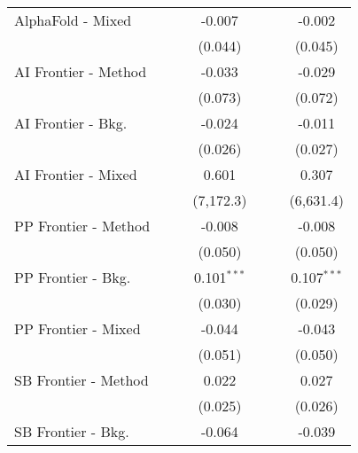 \begin{tabular}{lcccccc}
   AlphaFold - Mixed    &                &              & -0.007        &                &              & -0.002\\   
                        &                &              & (0.044)       &                &              & (0.045)\\   
   AI Frontier - Method &                &              & -0.033        &                &              & -0.029\\   
                        &                &              & (0.073)       &                &              & (0.072)\\   
   AI Frontier - Bkg.   &                &              & -0.024        &                &              & -0.011\\   
                        &                &              & (0.026)       &                &              & (0.027)\\   
   AI Frontier - Mixed  &                &              & 0.601         &                &              & 0.307\\   
                        &                &              & (7,172.3)     &                &              & (6,631.4)\\   
   PP Frontier - Method &                &              & -0.008        &                &              & -0.008\\   
                        &                &              & (0.050)       &                &              & (0.050)\\   
   PP Frontier - Bkg.   &                &              & 0.101$^{***}$ &                &              & 0.107$^{***}$\\   
                        &                &              & (0.030)       &                &              & (0.029)\\   
   PP Frontier - Mixed  &                &              & -0.044        &                &              & -0.043\\   
                        &                &              & (0.051)       &                &              & (0.050)\\   
   SB Frontier - Method &                &              & 0.022         &                &              & 0.027\\   
                        &                &              & (0.025)       &                &              & (0.026)\\   
   SB Frontier - Bkg.   &                &              & -0.064        &                &              & -0.039\\   

\end{tabular}
